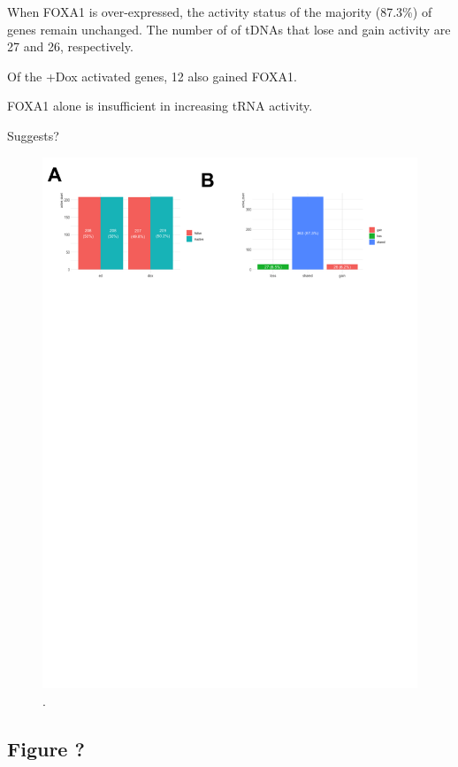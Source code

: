 \documentclass[
  12pt,
]{article}
\begin{document}
When FOXA1 is over-expressed, the activity status of the majority (87.3\%) of genes remain unchanged.
The number of of tDNAs that lose and gain activity are 27 and 26, respectively.

Of the +Dox activated genes, 12 also gained FOXA1.

FOXA1 alone is insufficient in increasing tRNA activity.

Suggests?

\begin{figure}[H]

{\centering \includegraphics[width=1\linewidth]{../images/results-03} 

}

\caption{.}\label{fig:results-3}
\end{figure}

\hypertarget{figure}{%
\subsection{Figure ?}\label{figure}}
\end{document}
